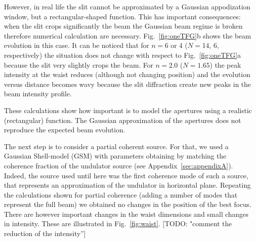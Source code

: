 \documentclass{iucr}              %
\newcommand{\todo}[1]{{\color{red}[TODO: "#1'']}}
\newcommand{\inblue}[1]{{\color{blue}#1}}
\begin{document}
 
However, in real life the slit cannot be approximated by a Gaussian appodization window, but a rectangular-shaped function. This has important consequences: when the slit crops significantly the beam the Gaussian beam regime is broken therefore numerical calculation are necessary. Fig.~\ref{fig:oneTFG}b shows the beam evolution in this case.  It can be noticed that for $n=$6 or 4 ($N=$14, 6, respectively) the situation does not change with respect to Fig.~\ref{fig:oneTFG}a because the slit very slightly crops the beam. For $n=2.0$ ($N=1.65$) the peak intensity at the waist reduces (although not changing position) and the evolution versus distance becomes wavy because the slit diffraction create new peaks in the beam intensity profile. 

\inblue{These calculations show how important is to model the apertures using a realistic (rectangular) function. The Gaussian approximation of the apertures does not reproduce the expected beam evolution. }

The next step is to consider a partial coherent source. For that, we used a Gaussian Shell-model (GSM) with parameters obtaining by matching the coherence fraction of the undulator source (see Appendix~\ref{sec:appendixA}). Indeed, the source used until here was the first coherence mode of such a source, that represents an approximation of the undulator in horizontal plane. Repeating the calculations shown for partial coherence (adding a number of modes that represent the full beam) we obtained no changes in the position of the best focus. There are however important changes in the waist dimensions and small changes in intensity. These are illustrated in Fig.~\ref{fig:waist}. \todo{comment the reduction of the intensity}
\end{document}
